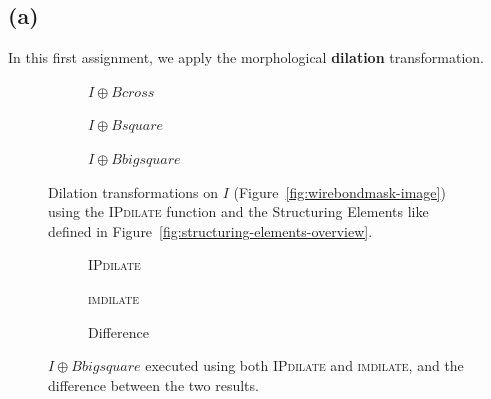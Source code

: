 \documentclass{article}
\begin{document}
\subsection*{(a)} In this first assignment, we apply the morphological \textbf{dilation} transformation. 
\begin{figure}[H]
     \centering
     \begin{subfigure}[b]{0.3\textwidth}
         \centering
         
         \caption{$I \oplus Bcross$}
         \label{fig:wirebondmask_Bcross_dilated}
     \end{subfigure}
     \hfill
     \begin{subfigure}[b]{0.3\textwidth}
         \centering
         
         \caption{$I \oplus Bsquare$}
         \label{fig:wirebondmask_Bsquare_dilated}
     \end{subfigure}
     \hfill
     \begin{subfigure}[b]{0.3\textwidth}
         \centering
         
         \caption{$I \oplus Bbigsquare$}
         \label{fig:wirebondmask_Bbigsquare_dilated}
     \end{subfigure}
     
    \caption{Dilation transformations on $I$ (Figure~\ref{fig:wirebondmask-image}) using the \textsc{IPdilate} function and the Structuring Elements like defined in Figure~\ref{fig:structuring-elements-overview}.}
    \label{fig:wirebondmask_dilated}
\end{figure}

\begin{figure}[H]
     \centering
     \begin{subfigure}[b]{0.3\textwidth}
         \centering
         
         \caption{\textsc{IPdilate}}
         \label{fig:wirebondmask_Bbigsquare_IPdilate}
     \end{subfigure}
     \hfill
     \begin{subfigure}[b]{0.3\textwidth}
         \centering
         
         \caption{\textsc{imdilate}}
         \label{fig:wirebondmask_Bbigsquare_imdilate}
     \end{subfigure}
     \hfill
     \begin{subfigure}[b]{0.3\textwidth}
         \centering
         
         \caption{Difference}
         \label{fig:wirebondmask_Bbigsquare_dilate_diff}
     \end{subfigure}
     
    \caption{$I \oplus Bbigsquare$ executed using both \textsc{IPdilate} and \textsc{imdilate}, and the difference between the two results.}
    \label{fig:wirebondmask_dilate_diff}
\end{figure}
\end{document}

